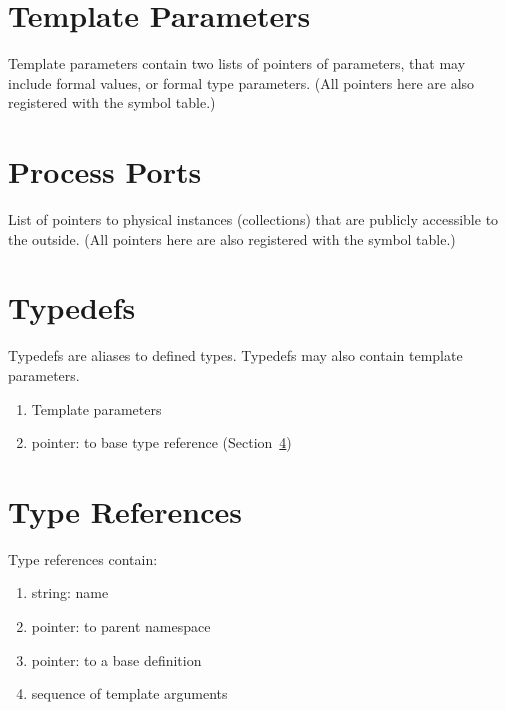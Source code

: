 \section{Template Parameters}
\label{sec:definition:template}

Template parameters contain two lists of pointers of parameters, 
that may include formal values, or formal type parameters.  
(All pointers here are also registered with the symbol table.)  

\section{Process Ports}
\label{sec:definition:ports}

List of pointers to physical instances (collections) that are publicly
accessible to the outside.  
(All pointers here are also registered with the symbol table.)  

\section{Typedefs}
\label{sec:definition:typedef}

Typedefs are aliases to defined types.  
Typedefs may also contain template parameters.  

\begin{enumerate}
\item Template parameters
\item pointer: to base type reference (Section~\ref{sec:definition:typeref})
\end{enumerate}

\section{Type References}
\label{sec:definition:typeref}

Type references contain:

\begin{enumerate}
\item string: name
\item pointer: to parent namespace
\item pointer: to a base definition
\item sequence of template arguments
\end{enumerate}

